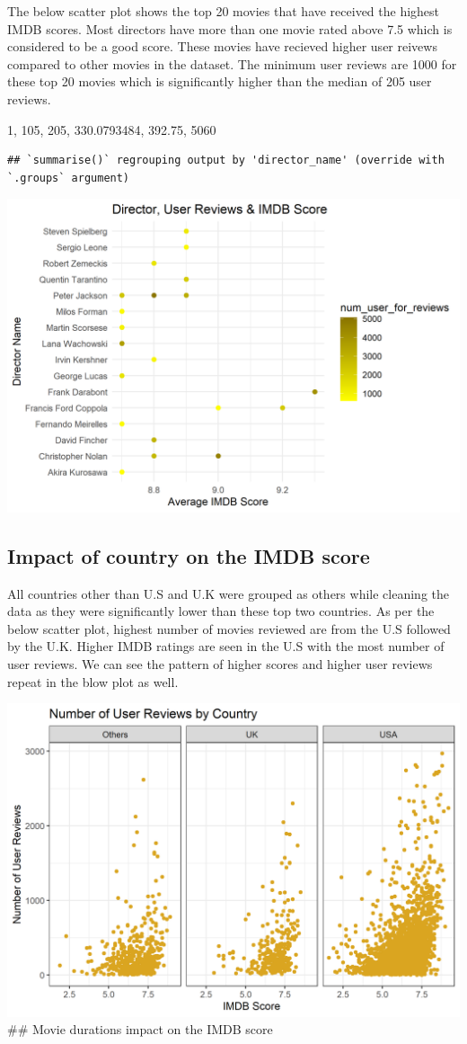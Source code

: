 \documentclass[
]{article}
\begin{document}
The below scatter plot shows the top 20 movies that have received the
highest IMDB scores. Most directors have more than one movie rated above
7.5 which is considered to be a good score. These movies have recieved
higher user reivews compared to other movies in the dataset. The minimum
user reviews are 1000 for these top 20 movies which is significantly
higher than the median of 205 user reviews.

1, 105, 205, 330.0793484, 392.75, 5060

\begin{verbatim}
## `summarise()` regrouping output by 'director_name' (override with `.groups` argument)
\end{verbatim}

\includegraphics[width=0.75\linewidth]{IMDB_files/figure-latex/movie_by_director-1}

\hypertarget{impact-of-country-on-the-imdb-score}{%
\subsection{Impact of country on the IMDB
score}\label{impact-of-country-on-the-imdb-score}}

All countries other than U.S and U.K were grouped as others while
cleaning the data as they were significantly lower than these top two
countries. As per the below scatter plot, highest number of movies
reviewed are from the U.S followed by the U.K. Higher IMDB ratings are
seen in the U.S with the most number of user reviews. We can see the
pattern of higher scores and higher user reviews repeat in the blow plot
as well.

\includegraphics[width=0.75\linewidth]{IMDB_files/figure-latex/user reviews-1}
\#\# Movie durations impact on the IMDB score
\end{document}
